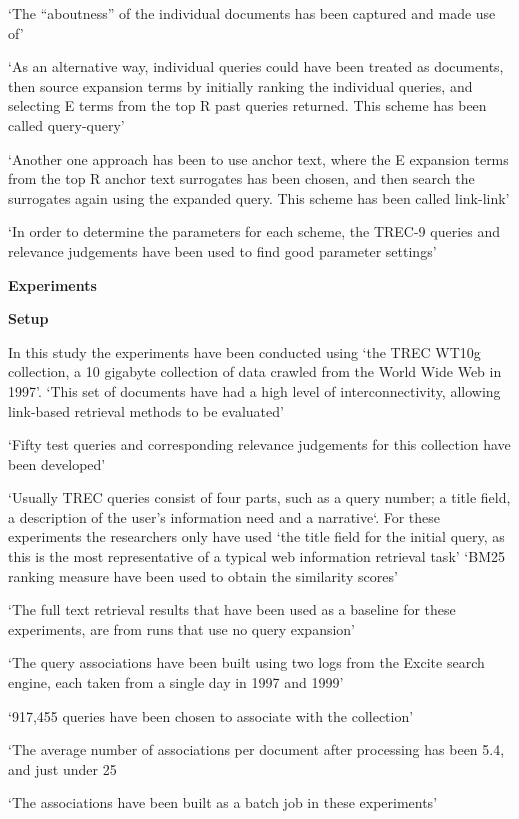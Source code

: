\documentclass[]{article}
\begin{document}
{{‘The “aboutness” of the individual documents has been captured and made use of’

‘As an alternative way, individual queries could have been treated as documents, then source expansion terms by initially ranking the individual queries, and selecting E terms from the top R past queries returned. This scheme has been called query-query’

‘Another one approach has been to use anchor text, where the E expansion terms from the top R anchor text surrogates has been chosen, and then search the surrogates again using the expanded query. This scheme has been called link-link’

‘In order to determine the parameters for each scheme, the TREC-9 queries and relevance judgements have been used to find good parameter settings’
 
\textbf{Experiments}

\textbf{Setup}
	
In this study the experiments have been conducted using ‘the TREC WT10g collection, a 10 gigabyte collection of data crawled from the World Wide Web in 1997’. ‘This set of documents have had a high level of interconnectivity, allowing link-based retrieval methods to be evaluated’

‘Fifty test queries and corresponding relevance judgements for this collection have been developed’

‘Usually TREC queries consist of four parts, such as a query number; a title field, a description of the user’s information need and a narrative‘.  For these experiments the researchers only have used ‘the title field for the initial query, as this is the most representative of a typical web information retrieval task’ 
‘BM25 ranking measure have been used to obtain the similarity scores’

‘The full text retrieval results that have been used as a baseline for these experiments, are from runs that use no query expansion’

‘The query associations have been built using two logs from the Excite search engine, each taken from a single day in 1997 and 1999’

‘917,455 queries have been chosen to associate with the collection’

‘The average number of associations per document after processing has been 5.4, and just under 25%

‘The associations have been built as a batch job in these experiments’

}}
\end{document}
